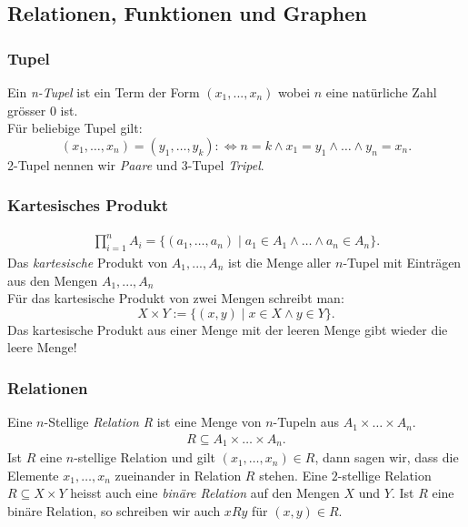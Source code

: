 \subsection{Relationen, Funktionen und Graphen}%

\subsubsection{Tupel}%
\label{ssub:tupel}
Ein \textit{n-Tupel} ist ein Term der Form $(x_1,...,x_n)$ wobei $n$ eine natürliche Zahl grösser $0$ ist. \\
Für beliebige Tupel gilt:
\begin{equation}
	(x_1,\dots,x_n)=(y_1,\dots,y_k):\Leftrightarrow n=k\land x_1=y_1\land\dots\land y_n=x_n.
\end{equation}
2-Tupel nennen wir \textit{Paare} und 3-Tupel \textit{Tripel}.

\subsubsection{Kartesisches Produkt}%
\label{ssub:kartesisches_produkt}
\begin{minipage}{0.9\linewidth}
	\begin{align*}
		\prod_{i=1}^{n}A_i=\big\{(a_1,\dots,a_n)\mid a_1\in A_1\land\dots\land a_n\in A_n \big\}.
	\end{align*}
	Das \textit{kartesische} Produkt von $A_1, ..., A_n$ ist die Menge aller $n$-Tupel mit Einträgen aus den Mengen $A_1,
		..., A_n$
	\\
	Für das kartesische Produkt von zwei Mengen schreibt man:
	\[
		X\times Y:=\{(x,y)\mid x\in X\land y\in Y \}.
	\]
	Das kartesische Produkt aus einer Menge mit der leeren Menge gibt wieder die leere Menge!
\end{minipage}

\subsubsection{Relationen}%
\label{ssub:relationen}
\begin{minipage}{0.9\linewidth}
	Eine $n$-Stellige \textit{Relation R} ist eine Menge von $n$-Tupeln aus $A_1 \times \dots \times A_n$.
	\begin{align*}
		R\subseteq A_1\times\dots \times A_n.
	\end{align*}
	Ist $R$ eine $n$-stellige Relation und gilt $(x_1,\dots,x_n)\in R$, dann sagen wir, dass die Elemente $x_1,\dots,x_n$ zueinander in Relation $R$ stehen.
	Eine $2$-stellige Relation $R\subseteq X\times Y$ heisst auch eine \textit{binäre Relation} auf den Mengen $X$ und $Y$. Ist $R$ eine binäre Relation, so schreiben wir auch $xRy$ für $(x,y)\in R$.
\end{minipage}

